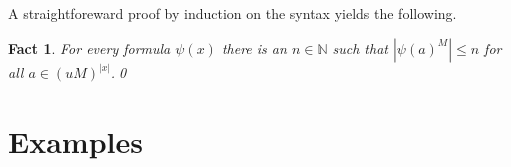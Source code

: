 \documentclass[12pt,letterpaper,oneside,reqno]{amsart}
\theoremstyle{plain}
\newtheorem{fact}[theorem]{Fact}
\theoremstyle{remark}
\begin{document}
A straightforeward proof by induction on the syntax yields the following.

\begin{fact}\label{fact_finiteness}
  For every formula $\psi(x)$ there is an $n\in{\mathds N}$ such that $|\psi(a)^M|\le n$ for all $a\in(uM)^{|x|}$.\qed
\end{fact}


\section{Examples}

\def\ceq#1#2#3{\parbox[t]{25ex}{$\displaystyle #1$}\parbox{5ex}{\hfil $#2$}{$\displaystyle #3$}}
\end{document}

